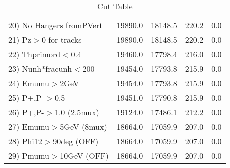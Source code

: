 \begin{table}[h!]
\begin{tabular}{||l||r|r|r|r||}
 20) No Hangers fromPVert &     19890.0 &     18148.5 &       220.2 &         0.0 \\
 21) Pz$>$0 for tracks    &     19890.0 &     18148.5 &       220.2 &         0.0 \\
 22) Thprimord$<$0.4      &     19460.0 &     17798.4 &       216.0 &         0.0 \\
 23) Nunh*fracunh$<$200   &     19454.0 &     17793.8 &       215.9 &         0.0 \\
 24) Emumu$>$2GeV         &     19454.0 &     17793.8 &       215.9 &         0.0 \\
 25) P+,P-$>$0.5          &     19451.0 &     17790.8 &       215.9 &         0.0 \\
 26) P+,P-$>$1.0 (2.5mux) &     19124.0 &     17486.1 &       212.2 &         0.0 \\
 27) Emumu$>$5GeV  (8mux) &     18664.0 &     17059.9 &       207.0 &         0.0 \\
 28) Phi12$>$90deg  (OFF) &     18664.0 &     17059.9 &       207.0 &         0.0 \\
 29) Pmumu$>$10GeV  (OFF) &     18664.0 &     17059.9 &       207.0 &         0.0 \\
 \hline
 \hline
 \end{tabular}
 \caption{Cut Table \cohpip }
 \label{tab-cut_copip}
 \end{table}
